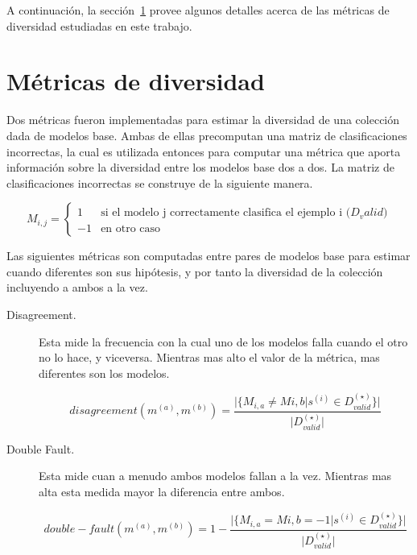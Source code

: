 A continuación, la sección~\ref{section:diversity-meassures} provee algunos detalles acerca de las métricas de diversidad estudiadas en este trabajo.

\section{Métricas de diversidad}\label{section:diversity-meassures}

Dos métricas fueron implementadas para estimar la diversidad de una colección dada de modelos base.
Ambas de ellas precomputan una matriz de clasificaciones incorrectas, la cual es utilizada entonces para computar una métrica que aporta información sobre la diversidad entre los modelos base dos a dos.
La matriz de clasificaciones incorrectas se construye de la siguiente manera.

\begin{equation}
    M_{i,j} =
    \begin{cases}
        1 & \text{si el modelo j correctamente clasifica el ejemplo i ($D_valid$)} \\
        -1 & \text{en otro caso}
    \end{cases}
\end{equation}

Las siguientes métricas son computadas entre pares de modelos base para estimar cuando diferentes son sus hipótesis, y por tanto la diversidad de la colección incluyendo a ambos a la vez.

\begin{description}

    \item[Disagreement.]
    Esta mide la frecuencia con la cual uno de los modelos falla cuando el otro no lo hace, y viceversa.
    Mientras mas alto el valor de la métrica, mas diferentes son los modelos.

    \begin{equation}
        disagreement(m^{(a)}, m^{(b)}) = \frac{\vert\{M_{i,a} \neq M{i,b} \vert s^{(i)} \in D^{(\star)}_{valid}\}\vert}{\vert D^{(\star)}_{valid} \vert}
    \end{equation}

    \item[Double Fault.]
    Esta mide cuan a menudo ambos modelos fallan a la vez.
    Mientras mas alta esta medida mayor la diferencia entre ambos.

    \begin{equation}
        double-fault(m^{(a)}, m^{(b)}) = 1 - \frac{\vert\{M_{i,a} = M{i,b} = -1 \vert s^{(i)} \in D^{(\star)}_{valid}\}\vert}{\vert D^{(\star)}_{valid} \vert}
    \end{equation}
    
\end{description}

